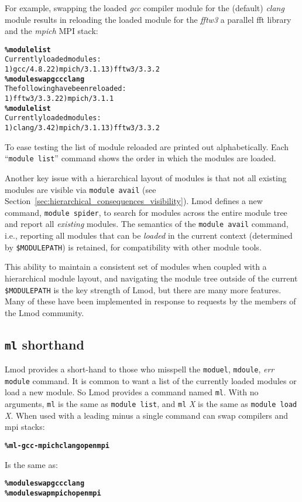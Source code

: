 For example, swapping the loaded \emph{gcc} compiler module for the (default)
\emph{clang} module results in reloading the loaded module for the
\emph{fftw3} a parallel fft library and the \emph{mpich} MPI stack:
{\small
  \begin{alltt}
    \textbf{\% module list}
    Currently loaded modules:
    1) gcc/4.8.2  2) mpich/3.1.1  3) fftw3/3.3.2
    \textbf{\% module swap gcc clang}
    The following have been reloaded:
    1) fftw3/3.3.2  2) mpich/3.1.1
    \textbf{\% module list}
    Currently loaded modules:
    1) clang/3.4  2) mpich/3.1.1  3) fftw3/3.3.2
\end{alltt}
}
\noindent
To ease testing the list of module reloaded are printed out
alphabetically. Each ``\texttt{module list}'' command shows the
order in which the modules are loaded.


Another key issue with a hierarchical layout of modules is that not all
existing modules are visible via \texttt{module avail} (see
Section~\ref{sec:hierarchical_consequences_visibility}). Lmod defines a
new command, \texttt{module spider}, to search for modules across the
entire module tree and report all \emph{existing} modules. The semantics of
the \texttt{module avail} command, i.e., reporting all modules that can
be \emph{loaded} in the current context (determined by
\texttt{\$MODULEPATH}) is retained, for compatibility with other module
tools.

This ability to maintain a consistent set of modules when coupled with a
hierarchical module layout, and navigating the module tree outside of the
current \texttt{\$MODULEPATH} is the key strength of Lmod, but there are
many more features.  Many of these have been implemented in response to
requests by the members of the Lmod community.

\subsection{\texttt{ml} shorthand}

Lmod provides a short-hand to those who misspell the \texttt{moduel}, \texttt{mdoule}, \emph{err}
\texttt{module} command.  It is common to want a list of the currently loaded
modules or load a new module.  So Lmod provides a command named
\texttt{ml}.  With no arguments, \texttt{ml} is the same as
\texttt{module list}, and \texttt{ml} \emph{X} is the same as \texttt{module
  load} \emph{X}.  When used with a leading minus a single command can
swap compilers and mpi stacks:
{\small
  \begin{alltt}
      \textbf{\% ml -gcc -mpich clang openmpi}
  \end{alltt}
}
\noindent
Is the same as:
{\small
  \begin{alltt}
      \textbf{\% module swap gcc clang}
      \textbf{\% module swap mpich openmpi}
  \end{alltt}
}

